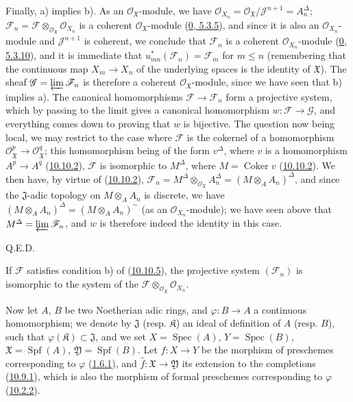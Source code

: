 Finally, a) implies b). As an
$\mathscr{O}_{\mathfrak{X}}$-module, we have
$\mathscr{O}_{X_n}=\mathscr{O}_{\mathfrak{X}}/
\mathscr{J}^{n+1}=A_n^\Delta$; $\mathscr{F}_n=\mathscr{F}
\otimes_{\mathscr{O}_{\mathfrak{X}}}\mathscr{O}_{X_n}$ is a coherent
$\mathscr{O}_{\mathfrak{X}}$-module
(\hyperref[0.5.3.5]{0, 5.3.5}), and since it is also an
$\mathscr{O}_{X_n}$-module and $\mathscr{J}^{n+1}$ is coherent,
we conclude that $\mathscr{F}_n$ is a coherent
$\mathscr{O}_{X_n}$-module
(\hyperref[0.5.3.10]{0, 5.3.10}), and it is immediate that
$u_{mn}^*(\mathscr{F}_n)=\mathscr{F}_m$ for $m\leq n$ (remembering
that the continuous map $X_m\to X_n$ of the underlying spaces is the
identity of $\mathfrak{X}$). The sheaf
$\mathscr{G}=\varprojlim\mathscr{F}_n$ is therefore a coherent
$\mathscr{O}_{\mathfrak{X}}$-module, since we have seen that b)
implies a). The canonical homomorphisms
$\mathscr{F}\to\mathscr{F}_n$ form a projective system, which by
passing to the limit gives a canonical homomorphism
$w:\mathscr{F}\to\mathscr{G}$, and everything comes down to proving that
$w$ is bijective. The question now being local, we may restrict to the
case where $\mathscr{F}$ is the cokernel of a homomorphism
$\mathscr{O}_{\mathfrak{X}}^p\to\mathscr{O}_{\mathfrak{X}}^q$; this
homomorphism being of the form $v^\Delta$, where $v$ is a homomorphism
$A^p\to A^q$ (\hyperref[I.10.10.2]{10.10.2}), $\mathscr{F}$ is
isomorphic to $M^\Delta$, where $M=\operatorname{Coker}v$
(\hyperref[I.10.10.2]{10.10.2}). We then have, by virtue of
(\hyperref[I.10.10.2]{10.10.2}),
$\mathscr{F}_n=M^\Delta\otimes_{\mathscr{O}_{\mathfrak{X}}}A_n^\Delta
=(M\otimes_A A_n)^\Delta$, and since the $\mathfrak{J}$-adic topology
on $M\otimes_A A_n$ is discrete, we have
$(M\otimes_A A_n)^\Delta=(M\otimes_A A_n)^{\sim}$ (as an
$\mathscr{O}_{X_n}$-module); we have seen above that
$M^\Delta=\varprojlim\mathscr{F}_n$, and $w$ is therefore indeed the
identity in this case.
\par\hfill Q.E.D.\par

\begin{corollary}[10.10.6]
\label{I.10.10.6}
If $\mathscr{F}$ satisfies condition b) of
(\hyperref[I.10.10.5]{10.10.5}), the projective system
$(\mathscr{F}_n)$ is isomorphic to the system of the
$\mathscr{F}\otimes_{\mathscr{O}_{\mathfrak{X}}}\mathscr{O}_{X_n}$.
\end{corollary}

\begin{env}[10.10.7]
\label{I.10.10.7}
Now let $A$, $B$ be two Noetherian adic rings, and
$\varphi:B\to A$ a continuous homomorphism; we denote by
$\mathfrak{J}$ (resp. $\mathfrak{K}$) an ideal of definition of $A$
(resp. $B$), such that $\varphi(\mathfrak{K})\subset\mathfrak{J}$, and
we set $X=\operatorname{Spec}(A)$, $Y=\operatorname{Spec}(B)$,
$\mathfrak{X}=\operatorname{Spf}(A)$,
$\mathfrak{Y}=\operatorname{Spf}(B)$. Let $f:X\to Y$ be the morphism
of preschemes corresponding to $\varphi$
(\hyperref[I.1.6.1]{1.6.1}), and $\widehat f:\mathfrak{X}\to
\mathfrak{Y}$ its extension to the completions
(\hyperref[I.10.9.1]{10.9.1}), which is also the morphism of
formal preschemes corresponding to $\varphi$
(\hyperref[I.10.2.2]{10.2.2}).
\end{env}

